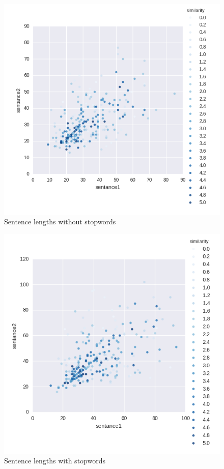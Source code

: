 \documentclass[10pt, a4paper]{article}
\begin{document}
\begin{figure}[h]
\begin{center}
\includegraphics[width=\columnwidth]{sen_len_no_stop.png}
\caption{Sentence lengths without stopwords}
\label{fig:lstm_2nd_layer}
\end{center}
\end{figure}

\begin{figure}[h]
\begin{center}
\includegraphics[width=\columnwidth]{sen_len_with_stop.png}
\caption{Sentence lengths with stopwords}
\label{fig:lstm_2nd_layer}
\end{center}
\end{figure}
\end{document}
